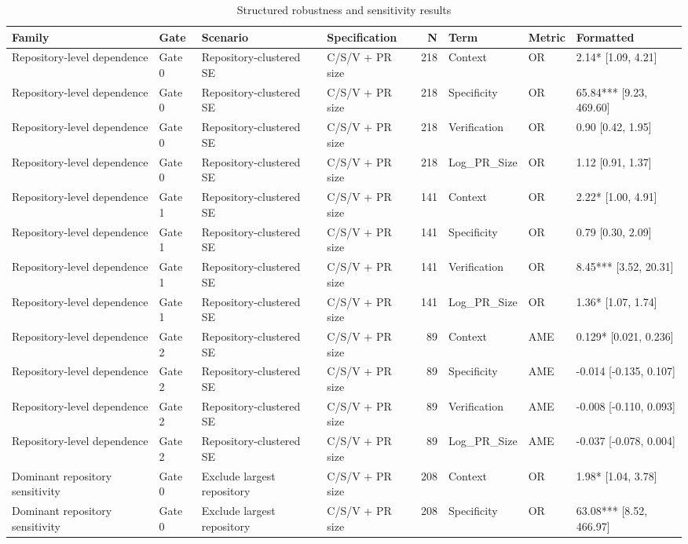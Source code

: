 \begin{table}
\caption{Structured robustness and sensitivity results}
\label{tab:robustness-full}
\begin{tabular}{llllrlll}
\toprule
Family & Gate & Scenario & Specification & N & Term & Metric & Formatted \\
\midrule
Repository-level dependence & Gate 0 & Repository-clustered SE & C/S/V + PR size & 218 & Context & OR & 2.14* [1.09, 4.21] \\
Repository-level dependence & Gate 0 & Repository-clustered SE & C/S/V + PR size & 218 & Specificity & OR & 65.84*** [9.23, 469.60] \\
Repository-level dependence & Gate 0 & Repository-clustered SE & C/S/V + PR size & 218 & Verification & OR & 0.90 [0.42, 1.95] \\
Repository-level dependence & Gate 0 & Repository-clustered SE & C/S/V + PR size & 218 & Log_PR_Size & OR & 1.12 [0.91, 1.37] \\
Repository-level dependence & Gate 1 & Repository-clustered SE & C/S/V + PR size & 141 & Context & OR & 2.22* [1.00, 4.91] \\
Repository-level dependence & Gate 1 & Repository-clustered SE & C/S/V + PR size & 141 & Specificity & OR & 0.79 [0.30, 2.09] \\
Repository-level dependence & Gate 1 & Repository-clustered SE & C/S/V + PR size & 141 & Verification & OR & 8.45*** [3.52, 20.31] \\
Repository-level dependence & Gate 1 & Repository-clustered SE & C/S/V + PR size & 141 & Log_PR_Size & OR & 1.36* [1.07, 1.74] \\
Repository-level dependence & Gate 2 & Repository-clustered SE & C/S/V + PR size & 89 & Context & AME & 0.129* [0.021, 0.236] \\
Repository-level dependence & Gate 2 & Repository-clustered SE & C/S/V + PR size & 89 & Specificity & AME & -0.014 [-0.135, 0.107] \\
Repository-level dependence & Gate 2 & Repository-clustered SE & C/S/V + PR size & 89 & Verification & AME & -0.008 [-0.110, 0.093] \\
Repository-level dependence & Gate 2 & Repository-clustered SE & C/S/V + PR size & 89 & Log_PR_Size & AME & -0.037 [-0.078, 0.004] \\
Dominant repository sensitivity & Gate 0 & Exclude largest repository & C/S/V + PR size & 208 & Context & OR & 1.98* [1.04, 3.78] \\
Dominant repository sensitivity & Gate 0 & Exclude largest repository & C/S/V + PR size & 208 & Specificity & OR & 63.08*** [8.52, 466.97] \\

\end{tabular}
\end{table}
